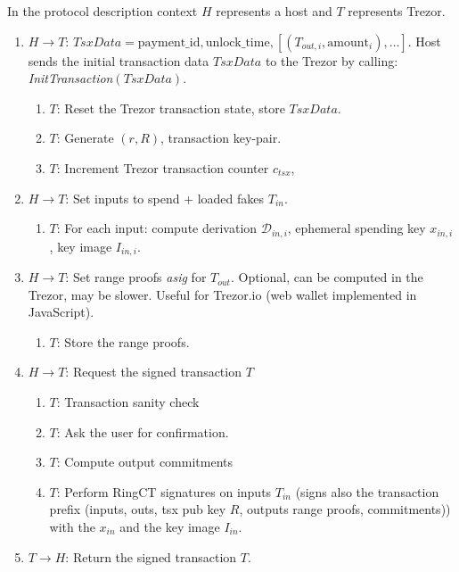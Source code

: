 \documentclass[]{article}
\begin{document}
In the protocol description context $H$ represents a host and $T$ represents Trezor.
\begin{enumerate}
	\item $H \rightarrow T$: $TsxData = \text{payment\_id},\text{unlock\_time},  \left[\left(T_{out,i}, \text{amount}_i \right), \dots \right]$. Host sends the initial transaction data $TsxData$ to the Trezor by calling: \emph{InitTransaction}$\left(TsxData\right)$.
	
	\begin{enumerate}
		\item $T$: Reset the Trezor transaction state, store $TsxData$.
		
		\item $T$: Generate $(r, R)$, transaction key-pair.
		
		\item $T$: Increment Trezor transaction counter $c_{tsx}$,
	\end{enumerate}
	
	\item $H \rightarrow T$: Set inputs to spend + loaded fakes $T_{in}$. 
	\begin{enumerate}
		\item $T$: For each input: compute derivation $\mathcal{D}_{in,i}$, ephemeral spending key $x_{in,i}$, key image $I_{in,i}$.
	\end{enumerate}
	
	\item $H \rightarrow T$: Set range proofs \emph{asig} for $T_{out}$. Optional, can be computed in the Trezor, may be slower. Useful for Trezor.io (web wallet implemented in JavaScript).
	\begin{enumerate}
		\item $T$: Store the range proofs.
	\end{enumerate}
	
	\item $H \rightarrow T$: Request the signed transaction $T$
	\begin{enumerate}
		\item $T$: Transaction sanity check
		
        \item $T$: Ask the user for confirmation.

		\item $T$: Compute output commitments
		
		\item $T$: Perform RingCT signatures on inputs $T_{in}$ (signs also the transaction prefix (inputs, outs, tsx pub key $R$, outputs range proofs, commitments)) with the $x_{in}$ and the key image $I_{in}$.
	\end{enumerate} 
	
	\item $T \rightarrow H$: Return the signed transaction $T$.
\end{enumerate}
\end{document}
